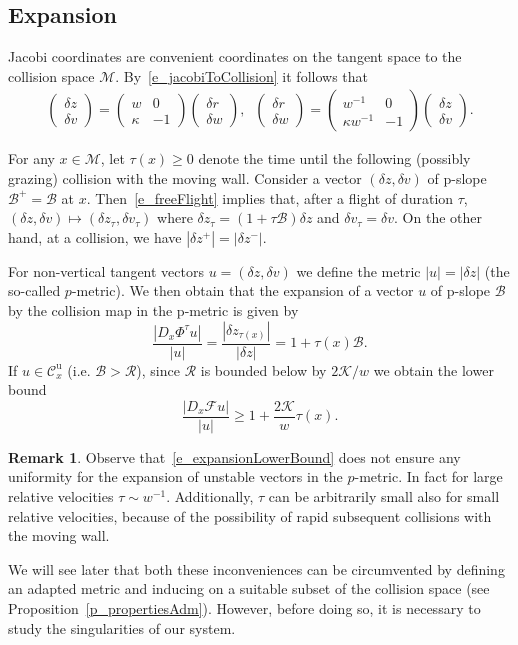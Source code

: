\documentclass[10pt]{amsart}
\theoremstyle{definition}\newtheorem{defi}[theo]{Definition}\newtheorem{rema}[theo]{Remark}\newtheorem{exam}[theo]{Example}\newtheorem{exem}[theo]{Example}\newtheorem{nota}[theo]{Notation}
\newcommand{\ct}{r}
\newcommand{\fft}{\tau}
\newcommand{\curv}{\kappa}
\newcommand{\inv}{^{-1}}
\newcommand{\unstable}{\text{u}}
\newcommand{\cK}{\mathcal{K}}
\newcommand{\cpar}{\mathcal{R}}
\newcommand{\pslope}{\mathcal{B}}
\newcommand{\cm}{\mathcal{F}}
\newcommand{\csp}{\mathcal{M}}
\newcommand{\cone}{\mathcal{C}}
\newcommand{\matrixtt}[4]{\left(
\begin{array}{cc}#1&#2\\#3&#4
\end{array}\right)}
\newcommand{\vectt}[2]{\left(
\begin{array}{c}#1\\#2
\end{array}\right)}
\newcommand{\coneu}{\cone^\unstable}
\newcommand{\ppPrivate}[2]{#1^{#2}}
\newcommand{\prePrivate}[1]{\ppPrivate{#1}{-}}
\newcommand{\postPrivate}[1]{\ppPrivate{#1}{+}}
\newcommand{\prz}{\prePrivate{z}}
\newcommand{\poz}{\postPrivate{z}}
\begin{document}
\subsection{Expansion}\label{s_Jacobian}
Jacobi coordinates are convenient coordinates on the tangent space to the collision space $\csp$. By~\eqref{e_jacobiToCollision} it follows that
\begin{align*}
\vectt{\delta z}{\delta v}=\matrixtt{w}{0}{\curv}{-1}\vectt{\delta\ct}{\delta w}, \;\;
\vectt{\delta\ct}{\delta w}=\matrixtt{w\inv}{0}{\curv w\inv}{-1}\vectt{\delta z}{\delta v}.
\end{align*}

For any $x\in\csp$, let $\fft(x)\ge 0$ denote the time until the following (possibly grazing) collision with the moving wall. Consider a vector $(\delta z,\delta v)$ of p-slope $\pslope^{+} = \pslope$ at $x$. Then~\eqref{e_freeFlight} implies that, after a flight of duration $\fft$, $(\delta z,\delta v)\mapsto(\delta z_{\fft},\delta v_{\fft})$ where $\delta z_\fft=(1+\fft\pslope)\delta z$ and $\delta v_\fft = \delta v$. On the other hand, at a collision, we have $|\delta \poz|=|\delta\prz|$.

For non-vertical tangent vectors $u = (\delta z,\delta v)$ we define the metric $|u| = |\delta z|$ (the so-called $p$-metric). We then obtain that the expansion of a vector $u$ of p-slope $\pslope$ by the collision map in the p-metric is given by
\begin{equation}\label{ExpPMetric}
\frac{| D_{x}\Phi^{\fft} u|}{|u|} =
\frac{|\delta z_{\fft(x)}|}{|\delta z|}=1+\fft(x)\pslope.
\end{equation}
If $u\in\coneu_{x}$ (i.e. $\pslope>\cpar$), since $\cpar$ is bounded below by $2\cK/w$ we obtain the lower bound
\begin{equation}\label{e_expansionLowerBound}
\frac{|D_{x}\cm u|}{|u|}\geq 1+\frac{2\cK}{w}\fft(x).
\end{equation}

\begin{rema}\label{r_needForAlpha}
Observe that~\eqref{e_expansionLowerBound} does not ensure any uniformity for the expansion of unstable vectors in the $p$-metric. In fact for large relative velocities $\fft\sim w\inv$. Additionally, $\fft$ can be arbitrarily small also for small relative velocities, because of the possibility of rapid subsequent collisions with the moving wall.

We will see later that both these inconveniences can be circumvented by defining an adapted metric and inducing on a suitable subset of the collision space (see Proposition~\ref{p_propertiesAdm}). However, before doing so, it is necessary to study the singularities of our system.
\end{rema}
\end{document}
